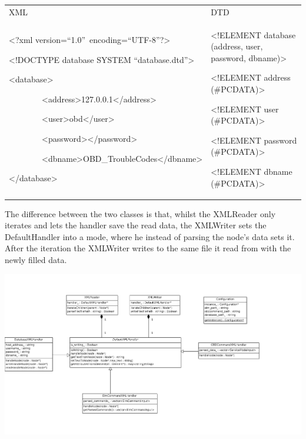 \begin{longtable}[]{@{}ll@{}}
\toprule
\begin{minipage}[t]{0.47\columnwidth}\raggedright\strut
{XML}
\strut\end{minipage} &
\begin{minipage}[t]{0.47\columnwidth}\raggedright\strut
{DTD}
\strut\end{minipage}\tabularnewline
\begin{minipage}[t]{0.47\columnwidth}\raggedright\strut
{\textless{}?}{xml
version}{=}{``1.0''}{~encoding}{=}{``UTF-8''}{?\textgreater{}}

{\textless{}!DOCTYPE database SYSTEM ``database.dtd''\textgreater{}}

{}

{\textless{}database\textgreater{}}

{~~~~~~~~}{\textless{}address\textgreater{}}{127.0.0.1}{\textless{}/address\textgreater{}}

{~~~~~~~~}{\textless{}user\textgreater{}}{obd}{\textless{}/user\textgreater{}}

{~~~~~~~~}{\textless{}password\textgreater{}\textless{}/password\textgreater{}}

{~~~~~~~~}{\textless{}dbname\textgreater{}}{OBD\_TroubleCodes}{\textless{}/dbname\textgreater{}}

{\textless{}/database\textgreater{}}
\strut\end{minipage} &
\begin{minipage}[t]{0.47\columnwidth}\raggedright\strut
{\textless{}!ELEMENT database (address, user, password,
dbname)\textgreater{}}

{\textless{}!ELEMENT address (\#PCDATA)\textgreater{}}

{\textless{}!ELEMENT user (\#PCDATA)\textgreater{}}

{\textless{}!ELEMENT password (\#PCDATA)\textgreater{}}

{\textless{}!ELEMENT dbname (\#PCDATA)\textgreater{}}
\strut\end{minipage}\tabularnewline
\bottomrule
\end{longtable}

{The difference between the two classes is that, whilst the XMLReader
only iterates and lets the handler save the read data, the XMLWriter
sets the DefaultHandler into a mode, where he instead of parsing the
node's data sets it. After the iteration the XMLWriter writes to the
same file it read from with the newly filled data. }

{\includegraphics{images/image03.png}}

